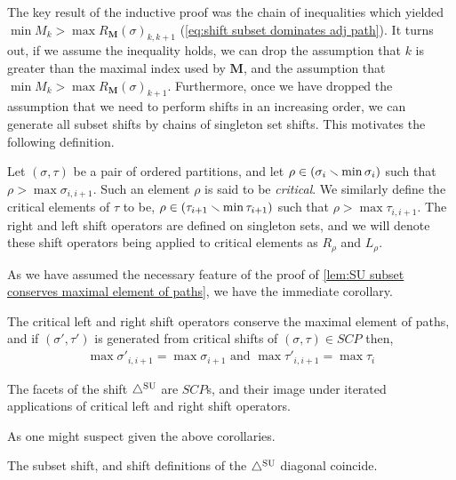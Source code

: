The key result of the inductive proof was the chain of inequalities which yielded $\min M_k > \max R_{\mathbf{M}}(\sigma)_{k,k+1}$ (\cref{eq:shift subset dominates adj path}).
It turns out, if we assume the inequality holds, we can drop the assumption that $k$ is greater than the maximal index used by $\mathbf{M}$, and the assumption that $\min M_k > \max R_{\mathbf{M}}(\sigma)_{k+1}$. 
Furthermore, once we have dropped the assumption that we need to perform shifts in an increasing order, we can generate all subset shifts by chains of singleton set shifts. This motivates the following definition. 
\begin{definition} \label{def:critical SU shift}
Let $(\sigma,\tau)$ be a pair of ordered partitions, and let $\rho \in (\sigma_i \smallsetminus \min \sigma_i)$ such that $\rho>\max \sigma_{i,i+1}$.
Such an element $\rho$ is said to be \emph{critical}. 
We similarly define the critical elements of $\tau$ to be, $\rho \in (\tau_{i+1} \smallsetminus \min\tau_{i+1})$ such that $\rho > \max \tau_{i,i+1}$. 
The right and left shift operators are defined on singleton sets, and we will denote these shift operators being applied to critical elements as $R_{\rho}$ and $L_{\rho}$.
\end{definition}

As we have assumed the necessary feature of the proof of \cref{lem:SU subset conserves maximal element of paths}, we have the immediate corollary.

\begin{corollary} 
    \label{cor: SU shift conserves maximal element of paths}
The critical left and right shift operators conserve the maximal element of paths, and if $(\sigma',\tau')$ is generated from critical shifts of $(\sigma,\tau) \in SCP$ then,
\begin{align*}
    \max \sigma'_{i,i+1} = \max \sigma_{i+1} \text{ and } \max \tau'_{i,i+1} = \max \tau_{i}
\end{align*}
\end{corollary}

\begin{definition}
The facets of the shift $\triangle^{\mathrm{SU}}$ are $SCP$s, and their image under iterated applications of critical left and right shift operators.
\end{definition}

As one might suspect given the above corollaries.

\begin{proposition}\label{prop:subset shift to shift bijection}
The subset shift, and shift definitions of the $\triangle^{\mathrm{SU}}$ diagonal coincide.
\end{proposition}

